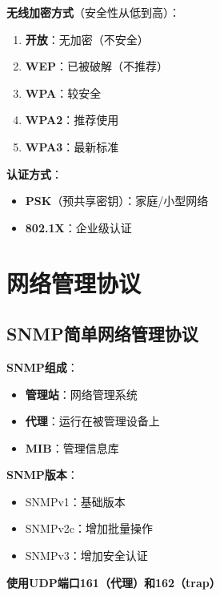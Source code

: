 \documentclass[12pt,a4paper]{ctexart}
\begin{document}
\begin{keybox}
\textbf{无线加密方式}（安全性从低到高）：

\begin{enumerate}[itemsep=0pt]
    \item \textbf{开放}：无加密（不安全）
    \item \textbf{WEP}：已被破解（不推荐）
    \item \textbf{WPA}：较安全
    \item \textbf{WPA2}：推荐使用
    \item \textbf{WPA3}：最新标准
\end{enumerate}

\textbf{认证方式}：
\begin{itemize}[itemsep=0pt]
    \item \textbf{PSK}（预共享密钥）：家庭/小型网络
    \item \textbf{802.1X}：企业级认证
\end{itemize}
\end{keybox}

\section{网络管理协议}

\subsection{SNMP简单网络管理协议}

\begin{keybox}
\textbf{SNMP组成}：
\begin{itemize}[itemsep=0pt]
    \item \textbf{管理站}：网络管理系统
    \item \textbf{代理}：运行在被管理设备上
    \item \textbf{MIB}：管理信息库
\end{itemize}

\textbf{SNMP版本}：
\begin{itemize}[itemsep=0pt]
    \item SNMPv1：基础版本
    \item SNMPv2c：增加批量操作
    \item SNMPv3：增加安全认证
\end{itemize}

\textbf{使用UDP端口161（代理）和162（trap）}
\end{keybox}
\end{document}
